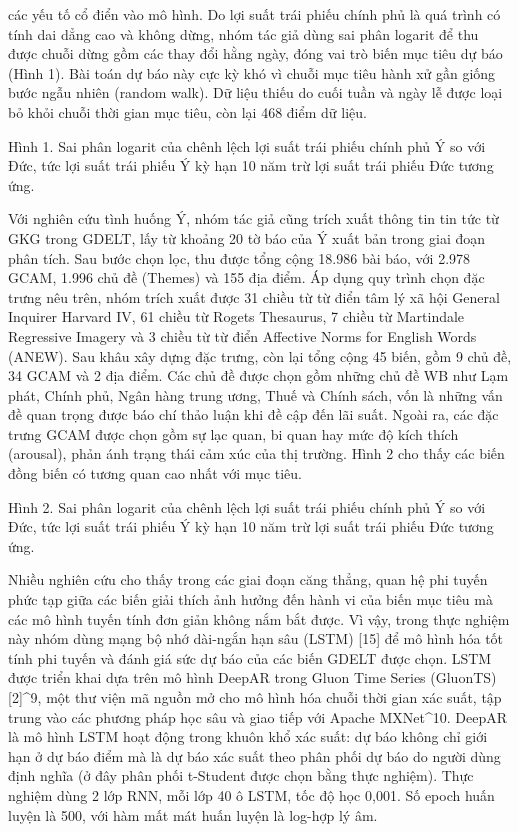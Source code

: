 các yếu tố cổ điển vào mô hình. Do lợi suất trái phiếu chính phủ là quá trình có tính dai dẳng cao và không dừng, nhóm tác giả dùng sai phân logarit để thu được chuỗi dừng gồm các thay đổi hằng ngày, đóng vai trò biến mục tiêu dự báo (Hình 1). Bài toán dự báo này cực kỳ khó vì chuỗi mục tiêu hành xử gần giống bước ngẫu nhiên (random walk). Dữ liệu thiếu do cuối tuần và ngày lễ được loại bỏ khỏi chuỗi thời gian mục tiêu, còn lại 468 điểm dữ liệu.

Hình 1. Sai phân logarit của chênh lệch lợi suất trái phiếu chính phủ Ý so với Đức, tức lợi suất trái phiếu Ý kỳ hạn 10 năm trừ lợi suất trái phiếu Đức tương ứng.

Với nghiên cứu tình huống Ý, nhóm tác giả cũng trích xuất thông tin tin tức từ GKG trong GDELT, lấy từ khoảng 20 tờ báo của Ý xuất bản trong giai đoạn phân tích. Sau bước chọn lọc, thu được tổng cộng 18.986 bài báo, với 2.978 GCAM, 1.996 chủ đề (Themes) và 155 địa điểm. Áp dụng quy trình chọn đặc trưng nêu trên, nhóm trích xuất được 31 chiều từ từ điển tâm lý xã hội General Inquirer Harvard IV, 61 chiều từ Roget\textquotesingle s Thesaurus, 7 chiều từ Martindale Regressive Imagery và 3 chiều từ từ điển Affective Norms for English Words (ANEW). Sau khâu xây dựng đặc trưng, còn lại tổng cộng 45 biến, gồm 9 chủ đề, 34 GCAM và 2 địa điểm. Các chủ đề được chọn gồm những chủ đề WB như Lạm phát, Chính phủ, Ngân hàng trung ương, Thuế và Chính sách, vốn là những vấn đề quan trọng được báo chí thảo luận khi đề cập đến lãi suất. Ngoài ra, các đặc trưng GCAM được chọn gồm sự lạc quan, bi quan hay mức độ kích thích (arousal), phản ánh trạng thái cảm xúc của thị trường. Hình 2 cho thấy các biến đồng biến có tương quan cao nhất với mục tiêu.

Hình 2. Sai phân logarit của chênh lệch lợi suất trái phiếu chính phủ Ý so với Đức, tức lợi suất trái phiếu Ý kỳ hạn 10 năm trừ lợi suất trái phiếu Đức tương ứng.

Nhiều nghiên cứu cho thấy trong các giai đoạn căng thẳng, quan hệ phi tuyến phức tạp giữa các biến giải thích ảnh hưởng đến hành vi của biến mục tiêu mà các mô hình tuyến tính đơn giản không nắm bắt được. Vì vậy, trong thực nghiệm này nhóm dùng mạng bộ nhớ dài-ngắn hạn sâu (LSTM) {[}15{]} để mô hình hóa tốt tính phi tuyến và đánh giá sức dự báo của các biến GDELT được chọn. LSTM được triển khai dựa trên mô hình DeepAR trong Gluon Time Series (GluonTS) {[}2{]}\^{}9, một thư viện mã nguồn mở cho mô hình hóa chuỗi thời gian xác suất, tập trung vào các phương pháp học sâu và giao tiếp với Apache MXNet\^{}10. DeepAR là mô hình LSTM hoạt động trong khuôn khổ xác suất: dự báo không chỉ giới hạn ở dự báo điểm mà là dự báo xác suất theo phân phối dự báo do người dùng định nghĩa (ở đây phân phối t-Student được chọn bằng thực nghiệm). Thực nghiệm dùng 2 lớp RNN, mỗi lớp 40 ô LSTM, tốc độ học 0,001. Số epoch huấn luyện là 500, với hàm mất mát huấn luyện là log-hợp lý âm.

